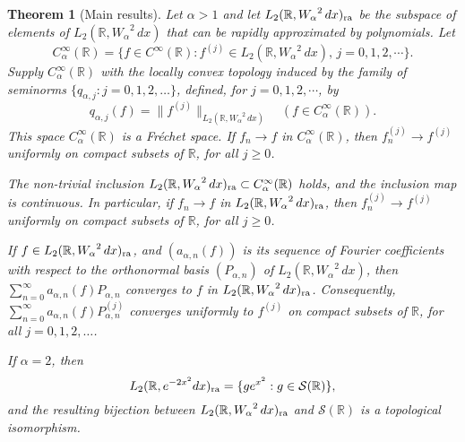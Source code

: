 \documentclass[12pt, reqno]{amsart}
\numberwithin{equation}{section}
\theoremstyle{plain}
\newtheorem{theorem}{Theorem}[section]
\theoremstyle{definition}
\begin{document}
\begin{theorem}[Main results]\label{the:mainresults}
 Let $\alpha>1$ and let ${L_2({{\mathbb R}},{W_\alpha}^2\,dx)_{\textup{ra}}}$ be the subspace of elements of ${{L_2({{\mathbb R}}, {W_\alpha}^2\,dx)}}$ that can be rapidly approximated by polynomials. Let
\begin{equation*}
{{C_\alpha^\infty({{\mathbb R}})}} =\{f\in C^{\infty}({{\mathbb R}}):f^{(j)}\in {{L_2({{\mathbb R}}, {W_\alpha}^2\,dx)}} ,\, j=0,1,2,\cdots\}.
\end{equation*}
Supply ${{C_\alpha^\infty({{\mathbb R}})}}$ with the locally convex topology induced by the family of seminorms $\{{q_{\alpha, j}} : j=0,1,2,\ldots\}$, defined, for $j=0,1,2,\cdots$,  by
\begin{equation*}
{q_{\alpha, j}}(f)=\|f^{(j)}\|_{{L_2({{\mathbb R}}, {W_\alpha}^2\,dx)}}\quad(f\in{{C_\alpha^\infty({{\mathbb R}})}}).
\end{equation*}
This space ${{C_\alpha^\infty({{\mathbb R}})}}$ is a Fr\'echet space. If $f_n\to f$ in ${{C_\alpha^\infty({{\mathbb R}})}}$, then $f_n^{(j)}\to f^{(j)}$ uniformly on  compact subsets of ${{\mathbb R}}$, for all $j\geq 0$.

The non-trivial inclusion ${L_2({{\mathbb R}},{W_\alpha}^2\,dx)_{\textup{ra}}}\subset{{C_\alpha^\infty({{\mathbb R}})}}$ holds, and the inclusion map is continuous. In particular, if $f_n\to f$ in ${L_2({{\mathbb R}},{W_\alpha}^2\,dx)_{\textup{ra}}}$, then $f_n^{(j)}\to f^{(j)}$ uniformly on  compact subsets of ${{\mathbb R}}$, for all $j\geq 0$.

If $f\in{L_2({{\mathbb R}},{W_\alpha}^2\,dx)_{\textup{ra}}}$, and ${({a_{\alpha,n}(f)})}$ is its sequence of Fourier coefficients with respect to the orthonormal basis ${({P_{\alpha,n}})}$ of ${{L_2({{\mathbb R}}, {W_\alpha}^2\,dx)}}$, then $\sum_{n=0}^\infty a_{\alpha, n}(f) P_{\alpha,n}$ converges to $f$ in ${L_2({{\mathbb R}},{W_\alpha}^2\,dx)_{\textup{ra}}}$. Consequently, $\sum_{n=0}^\infty a_{\alpha, n}(f) P_{\alpha,n}^{(j)}$ converges uniformly to $f^{(j)}$ on compact subsets of ${{\mathbb R}}$, for all $j=0,1,2,\ldots$.

If $\alpha=2$, then
\[
{L_2({{\mathbb R}},e^{-2x^2}dx)_{\textup{ra}}}=\{ge^{x^2} : g\in{{\mathcal S}}({{\mathbb R}})\},
\]
and the resulting bijection between ${L_2({{\mathbb R}},{W_\alpha}^2\,dx)_{\textup{ra}}}$ and ${{\mathcal S}}({{\mathbb R}})$ is a topological isomorphism.
\end{theorem}
\end{document}
